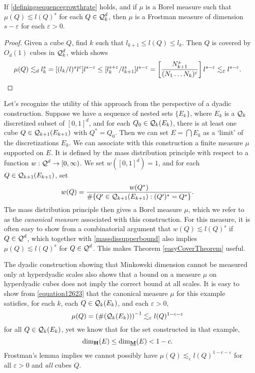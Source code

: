 \begin{theorem} \label{easyCoverTheorem}
	If \eqref{definingsequencegrowthrate} holds, and if $\mu$ is a Borel measure such that $\mu(Q) \lesssim l(Q)^s$ for each $Q \in \operatorname{\mathcal{Q}}_k^d$, then $\mu$ is a Frostman measure of dimension $s - \varepsilon$ for each $\varepsilon > 0$.
\end{theorem}
\begin{proof}
	Given a cube $Q$, find $k$ such that $l_{k+1} \leq l(Q) \leq l_k$. Then $Q$ is covered by $O_d(1)$ cubes in $\operatorname{\mathcal{Q}}^d_k$, which shows
	\[ \mu(Q) \lesssim_d l_k^s = [(l_k/l)^s l^\varepsilon ] l^{s - \varepsilon} \leq [l_k^{s + \varepsilon} / l_{k+1}^s] l^{s - \varepsilon} = \left[ \frac{N_{k+1}^s}{(N_1 \dots N_k)^\varepsilon} \right] l^{s-\varepsilon} \lesssim_\varepsilon l^{s-\varepsilon}. \qedhere \]
\end{proof}	

Let's recognize the utility of this approach from the perspective of a dyadic construction. Suppose we have a sequence of nested sets $\{ E_k \}$, where $E_k$ is a $\operatorname{\mathcal{Q}}_k$ discretized subset of $[0,1]^d$, and for each $Q_0 \in \operatorname{\mathcal{Q}}_k(E_k)$, there is at least one cube $Q \in \operatorname{\mathcal{Q}}_{k+1}(E_{k+1})$ with $Q^* = Q_0$. Then we can set $E = \bigcap E_k$ as a `limit' of the discretizations $E_k$. We can associate with this construction a finite measure $\mu$ supported on $E$. It is defined by the mass distribution principle with respect to a function $w: \operatorname{\mathcal{Q}}^d \to [0,\infty)$. We set $w([0,1]^d) = 1$, and for each $Q \in \operatorname{\mathcal{Q}}_{k+1}(E_{k+1})$, set
%
\[ w(Q) = \frac{w(Q^*)}{\# \{ Q' \in \operatorname{\mathcal{Q}}_{k+1}(E_{k+1}) : (Q')^* = Q^* \}}. \]
%
The mass distribution principle then gives a Borel measure $\mu$, which we refer to as the \emph{canonical measure} associated with this construction. For this measure, it is often easy to show from a combinatorial argument that $w(Q) \lesssim l(Q)^s$ if $Q \in \operatorname{\mathcal{Q}}^d$, which together with \eqref{massdissupperbound} also implies $\mu(Q) \lesssim l(Q)^s$ for $Q \in \operatorname{\mathcal{Q}}^d$. This makes Theorem \ref{easyCoverTheorem} useful.

\begin{remark}
	The dyadic construction showing that Minkowski dimension cannot be measured only at hyperdyadic scales also shows that a bound on a measure $\mu$ on hyperdyadic cubes does not imply the correct bound at all scales. It is easy to show from \eqref{equation12623} that the canonical measure $\mu$ for this example satisfies, for each $k$, each $Q \in \operatorname{\mathcal{Q}}_k(E_k)$, and each $\varepsilon > 0$,
	\[ \mu(Q) = \left( \#(\operatorname{\mathcal{Q}}_k(E_k)) \right)^{-1} \lesssim_\varepsilon l(Q)^{1-c-\varepsilon} \]
	for all $Q \in \operatorname{\mathcal{Q}}_k(E_k)$, yet we know that for the set constructed in that example,
	\[ \operatorname{\dim_{\mathbf{H}}}(E) \leq \operatorname{\dim_{\underline{\mathbf{M}}}}(E) < 1 - c. \]
	Frostman's lemma implies we cannot possibly have $\mu(Q) \lesssim_\varepsilon l(Q)^{1-c-\varepsilon}$ for all $\varepsilon > 0$ and \emph{all} cubes $Q$.
\end{remark}

